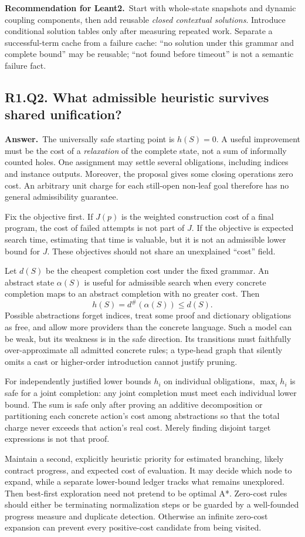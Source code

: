 \documentclass[11pt,a4paper]{article}
\theoremstyle{definition}
\theoremstyle{remark}
\newcommand{\answer}{\par\noindent\textbf{Answer.}\ }
\newcommand{\recommend}{\par\noindent\textbf{Recommendation for Leant2.}\ }
\newcommand{\qheading}[2]{\subsection{#1. #2}}
\begin{document}
\recommend Start with whole-state snapshots and dynamic coupling components,
then add reusable \emph{closed contextual solutions}. Introduce conditional
solution tables only after measuring repeated work. Separate a successful-term
cache from a failure cache: ``no solution under this grammar and complete bound''
may be reusable; ``not found before timeout'' is not a semantic failure fact.

\qheading{R1.Q2}{What admissible heuristic survives shared unification?}
\answer The universally safe starting point is $h(S)=0$. A useful improvement
must be the cost of a \emph{relaxation} of the complete state, not a sum of
informally counted holes. One assignment may settle several obligations,
including indices and instance outputs. Moreover, the proposal gives some
closing operations zero cost. An arbitrary unit charge for each still-open
non-leaf goal therefore has no general admissibility guarantee.

Fix the objective first. If $J(p)$ is the weighted construction cost of a final
program, the cost of failed attempts is not part of $J$. If the objective is
expected search time, estimating that time is valuable, but it is not an
admissible lower bound for $J$. These objectives should not share an unexplained
``cost'' field.

Let $d(S)$ be the cheapest completion cost under the fixed grammar. An abstract
state $\alpha(S)$ is useful for admissible search when every concrete completion
maps to an abstract completion with no greater cost. Then
\[
 h(S)=d^{\#}(\alpha(S))\le d(S).
 \tag{2}\label{eq:admissible}
\]
Possible abstractions forget indices, treat some proof and dictionary obligations
as free, and allow more providers than the concrete language. Such a model can
be weak, but its weakness is in the safe direction. Its transitions must
faithfully over-approximate all admitted concrete rules; a type-head graph
that silently omits a cast or higher-order introduction cannot justify pruning.

For independently justified lower bounds $h_i$ on individual obligations,
$\max_i h_i$ is safe for a joint completion: any joint completion must meet each
individual lower bound. The sum is safe only after proving an additive
decomposition or partitioning each concrete action's cost among abstractions
so that the total charge never exceeds that action's real cost. Merely finding
disjoint target expressions is not that proof.

Maintain a second, explicitly heuristic priority for estimated branching,
likely contract progress, and expected cost of evaluation. It may decide which
node to expand, while a separate lower-bound ledger tracks what remains
unexplored. Then best-first exploration need not pretend to be optimal A*.
Zero-cost rules should either be terminating normalization steps or be guarded
by a well-founded progress measure and duplicate detection. Otherwise an
infinite zero-cost expansion can prevent every positive-cost candidate from
being visited.
\end{document}

